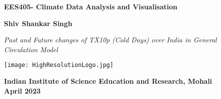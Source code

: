 \documentclass[a4paper, 12pt, twoside]{report}
\begin{document}
\date{}

\thispagestyle{empty}

\begin{titlepage}

    \begin{center}
        \LARGE
        \textbf{EES405- Climate Data Analysis and Visualisation}

        \vspace{1cm}


        \vspace{0.75cm}
        \Large
        \textbf{Shiv Shankar Singh}
        \vspace{1cm}

        \large
        \textit{Past and Future changes of TX10p (Cold Days) over India in General Circulation Model}

        \vspace{2cm}

        \texttt{[image: HighResolutionLogo.jpg]}

        \vspace{1cm}

        \large
        \textbf{Indian Institute of Science Education and Research, Mohali}\\
        \vspace{0.5cm}
        \large
        \textbf{April 2023}
    \end{center}


\end{titlepage}

\thispagestyle{empty}
\cleardoublepage




\cleardoublepage

\end{document}
